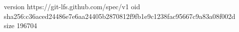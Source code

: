 version https://git-lfs.github.com/spec/v1
oid sha256:c36aced24486e7e6aa24405b2870812f9fb1e9c1238fac95667c9a83a08f002d
size 196704
